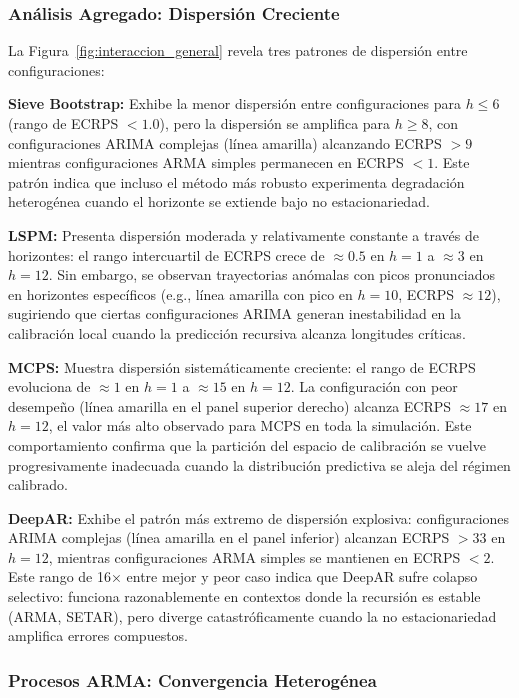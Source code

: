 \subsubsection{Análisis Agregado: Dispersión Creciente}

La Figura~\ref{fig:interaccion_general} revela tres patrones de dispersión entre configuraciones:

\textbf{Sieve Bootstrap:} Exhibe la menor dispersión entre configuraciones para $h \leq 6$ (rango de ECRPS $< 1.0$), pero la dispersión se amplifica para $h \geq 8$, con configuraciones ARIMA complejas (línea amarilla) alcanzando ECRPS $> 9$ mientras configuraciones ARMA simples permanecen en ECRPS $< 1$. Este patrón indica que incluso el método más robusto experimenta degradación heterogénea cuando el horizonte se extiende bajo no estacionariedad.

\textbf{LSPM:} Presenta dispersión moderada y relativamente constante a través de horizontes: el rango intercuartil de ECRPS crece de $\approx 0.5$ en $h=1$ a $\approx 3$ en $h=12$. Sin embargo, se observan trayectorias anómalas con picos pronunciados en horizontes específicos (e.g., línea amarilla con pico en $h=10$, ECRPS $\approx 12$), sugiriendo que ciertas configuraciones ARIMA generan inestabilidad en la calibración local cuando la predicción recursiva alcanza longitudes críticas.

\textbf{MCPS:} Muestra dispersión sistemáticamente creciente: el rango de ECRPS evoluciona de $\approx 1$ en $h=1$ a $\approx 15$ en $h=12$. La configuración con peor desempeño (línea amarilla en el panel superior derecho) alcanza ECRPS $\approx 17$ en $h=12$, el valor más alto observado para MCPS en toda la simulación. Este comportamiento confirma que la partición del espacio de calibración se vuelve progresivamente inadecuada cuando la distribución predictiva se aleja del régimen calibrado.

\textbf{DeepAR:} Exhibe el patrón más extremo de dispersión explosiva: configuraciones ARIMA complejas (línea amarilla en el panel inferior) alcanzan ECRPS $> 33$ en $h=12$, mientras configuraciones ARMA simples se mantienen en ECRPS $< 2$. Este rango de 16× entre mejor y peor caso indica que DeepAR sufre colapso selectivo: funciona razonablemente en contextos donde la recursión es estable (ARMA, SETAR), pero diverge catastróficamente cuando la no estacionariedad amplifica errores compuestos.

\subsubsection{Procesos ARMA: Convergencia Heterogénea}

